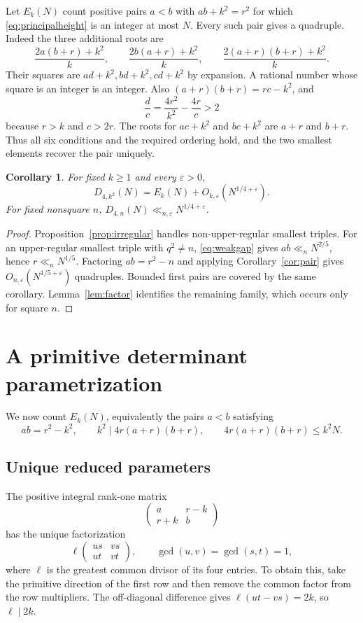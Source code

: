 \documentclass[11pt,a4paper]{article}
\numberwithin{equation}{section}
\newtheorem{corollary}[theorem]{Corollary}
\theoremstyle{remark}
\newcommand{\eps}{\varepsilon}
\begin{document}
Let $E_k(N)$ count positive pairs $a<b$ with $ab+k^2=r^2$ for which \eqref{eq:principalheight} is an integer at most $N$. Every such pair gives a quadruple. Indeed the three additional roots are
\begin{equation}\label{eq:principalroots}
\frac{2a(b+r)+k^2}{k},\qquad
\frac{2b(a+r)+k^2}{k},\qquad
\frac{2(a+r)(b+r)+k^2}{k}.
\end{equation}
Their squares are $ad+k^2,bd+k^2,cd+k^2$ by expansion. A rational number whose square is an integer is an integer. Also $(a+r)(b+r)=rc-k^2$, and
\[
\frac dc=\frac{4r^2}{k^2}-\frac{4r}{c}>2
\]
because $r>k$ and $c>2r$. The roots for $ac+k^2$ and $bc+k^2$ are $a+r$ and $b+r$. Thus all six conditions and the required ordering hold, and the two smallest elements recover the pair uniquely.

\begin{corollary}\label{cor:separation}
For fixed $k\ge1$ and every $\eps>0$,
\begin{equation}\label{eq:separation}
D_{4,k^2}(N)=E_k(N)+O_{k,\eps}(N^{1/4+\eps}).
\end{equation}
For fixed nonsquare $n$, $D_{4,n}(N)\ll_{n,\eps}N^{1/4+\eps}$.
\end{corollary}
\begin{proof}
Proposition~\ref{prop:irregular} handles non-upper-regular smallest triples. For an upper-regular smallest triple with $q^2\ne n$, \eqref{eq:weakgap} gives $ab\ll_n N^{2/5}$, hence $r\ll_n N^{1/5}$. Factoring $ab=r^2-n$ and applying Corollary~\ref{cor:pair} gives $O_{n,\eps}(N^{1/5+\eps})$ quadruples. Bounded first pairs are covered by the same corollary. Lemma~\ref{lem:factor} identifies the remaining family, which occurs only for square $n$.
\end{proof}

\section{A primitive determinant parametrization}\label{sec:parameters}
We now count $E_k(N)$, equivalently the pairs $a<b$ satisfying
\begin{equation}\label{eq:paircount}
ab=r^2-k^2,\qquad k^2\mid4r(a+r)(b+r),\qquad
4r(a+r)(b+r)\le k^2N.
\end{equation}
\subsection{Unique reduced parameters}
The positive integral rank-one matrix
\[
\begin{pmatrix}a&r-k\\r+k&b\end{pmatrix}
\]
has the unique factorization
\[
\ell\begin{pmatrix}us&vs\\ut&vt\end{pmatrix},\qquad
\gcd(u,v)=\gcd(s,t)=1,
\]
where $\ell$ is the greatest common divisor of its four entries. To obtain this, take the primitive direction of the first row and then remove the common factor from the row multipliers. The off-diagonal difference gives $\ell(ut-vs)=2k$, so $\ell\mid2k$.
\end{document}

